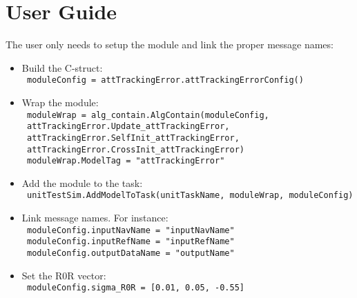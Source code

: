 
\section{User Guide}

The user only needs to setup the module and link the proper message names:

\begin{itemize}
\item Build the C-struct: \\
\texttt{    moduleConfig = attTrackingError.attTrackingErrorConfig()}
\item Wrap the module: \\
\texttt{  moduleWrap = alg\_contain.AlgContain(moduleConfig,} \\
\texttt{  attTrackingError.Update\_attTrackingError,} \\
\texttt{ attTrackingError.SelfInit\_attTrackingError,} \\
\texttt{ attTrackingError.CrossInit\_attTrackingError)} \\
\texttt{ moduleWrap.ModelTag = "attTrackingError"} 
\item Add the module to the task: \\
 \texttt{ unitTestSim.AddModelToTask(unitTaskName, moduleWrap, moduleConfig)}
\item Link message names. For instance: \\
  \texttt{  moduleConfig.inputNavName  = "inputNavName"} \\
     \texttt{   moduleConfig.inputRefName  = "inputRefName"} \\
     \texttt{   moduleConfig.outputDataName = "outputName"}
\item  Set the R0R vector: \\
\texttt{    moduleConfig.sigma\_R0R  = [0.01, 0.05, -0.55]}
\end{itemize}